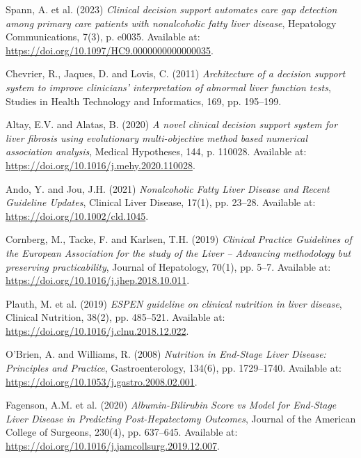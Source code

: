 \documentclass{article}
\begin{document}
\begin{thebibliography}{9}
    
    Spann, A. et al. (2023)
    \textit{Clinical decision support automates care gap detection among primary care patients with nonalcoholic fatty liver disease},
    Hepatology Communications, 7(3), p. e0035.
    Available at: \url{https://doi.org/10.1097/HC9.0000000000000035}.
    
    Chevrier, R., Jaques, D. and Lovis, C. (2011)
    \textit{Architecture of a decision support system to improve clinicians’ interpretation of abnormal liver function tests},
    Studies in Health Technology and Informatics, 169, pp. 195–199.
    
    Altay, E.V. and Alatas, B. (2020)
    \textit{A novel clinical decision support system for liver fibrosis using evolutionary multi-objective method based numerical association analysis},
    Medical Hypotheses, 144, p. 110028.
    Available at: \url{https://doi.org/10.1016/j.mehy.2020.110028}.
    
    Ando, Y. and Jou, J.H. (2021)
    \textit{Nonalcoholic Fatty Liver Disease and Recent Guideline Updates},
    Clinical Liver Disease, 17(1), pp. 23–28.
    Available at: \url{https://doi.org/10.1002/cld.1045}.
    
    Cornberg, M., Tacke, F. and Karlsen, T.H. (2019)
    \textit{Clinical Practice Guidelines of the European Association for the study of the Liver – Advancing methodology but preserving practicability},
    Journal of Hepatology, 70(1), pp. 5–7.
    Available at: \url{https://doi.org/10.1016/j.jhep.2018.10.011}.
    
    Plauth, M. et al. (2019)
    \textit{ESPEN guideline on clinical nutrition in liver disease},
    Clinical Nutrition, 38(2), pp. 485–521.
    Available at: \url{https://doi.org/10.1016/j.clnu.2018.12.022}.
    
    O’Brien, A. and Williams, R. (2008)
    \textit{Nutrition in End-Stage Liver Disease: Principles and Practice},
    Gastroenterology, 134(6), pp. 1729–1740.
    Available at: \url{https://doi.org/10.1053/j.gastro.2008.02.001}.
    
    Fagenson, A.M. et al. (2020)
    \textit{Albumin-Bilirubin Score vs Model for End-Stage Liver Disease in Predicting Post-Hepatectomy Outcomes},
    Journal of the American College of Surgeons, 230(4), pp. 637–645.
    Available at: \url{https://doi.org/10.1016/j.jamcollsurg.2019.12.007}.


\end{thebibliography}
\end{document}
